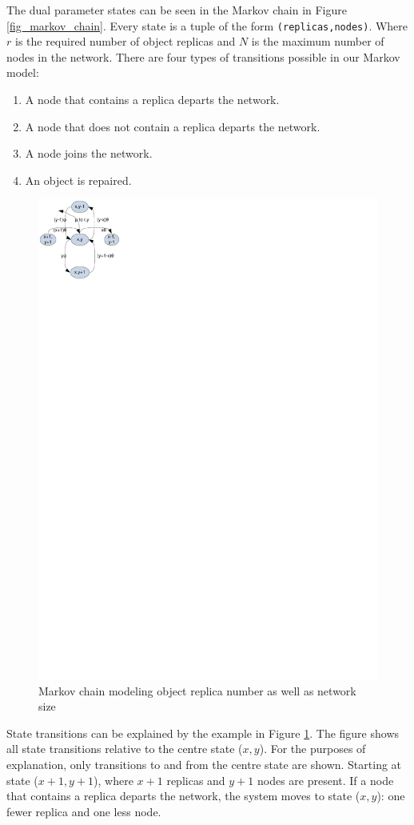 \documentclass[10pt,a4paper,conference]{IEEEtran}
\begin{document}
The dual parameter states can be seen in the Markov chain in Figure \ref{fig_markov_chain}. Every state is a tuple of the form \verb.(replicas,nodes).. Where $r$ is the required number of object replicas and $N$ is the maximum number of nodes in the network. There are four types of transitions possible in our Markov model:
\begin{enumerate}
\item A node that contains a replica departs the network.
\item A node that does not contain a replica departs the network.
\item A node joins the network.
\item An object is repaired.
\end{enumerate}


\begin{figure}[htbp]
 \centering
 \includegraphics[clip=true, viewport=0.0cm 24.5cm 5.0cm 30cm, width=0.6\columnwidth]{Markov_example}
 \caption{Markov chain modeling object replica number as well as network size}
 \label{fig_markov_example}
\end{figure}

State transitions can be explained by the example in Figure \ref{fig_markov_example}. The figure shows all state transitions relative to the centre state ($x,y$). For the purposes of explanation, only transitions to and from the centre state are shown. Starting at state ($x+1,y+1$), where $x+1$ replicas and $y+1$ nodes are present. If a node that contains a replica departs the network, the system moves to state ($x,y$): one fewer replica and one less node.
\end{document}
